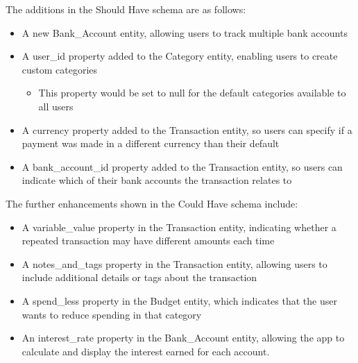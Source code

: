 \documentclass{l4proj}
\begin{document}
The additions in the Should Have schema are as follows:
\begin{itemize}
    \item A new Bank\_Account entity, allowing users to track multiple bank accounts
    \item A user\_id property added to the Category entity, enabling users to create custom categories
    \begin{itemize}
        \item This property would be set to null for the default categories available to all users
    \end{itemize}
    \item A currency property added to the Transaction entity, so users can specify if a payment was made in a different currency than their default
    \item A bank\_account\_id property added to the Transaction entity, so users can indicate which of their bank accounts the transaction relates to
\end{itemize}
\vspace{0.5em}
The further enhancements shown in the Could Have schema include:
\begin{itemize}
    \item A variable\_value property in the Transaction entity, indicating whether a repeated transaction may have different amounts each time
    \item A notes\_and\_tags property in the Transaction entity, allowing users to include additional details or tags about the transaction
    \item A spend\_less property in the Budget entity, which indicates that the user wants to reduce spending in that category
    \item An interest\_rate property in the Bank\_Account entity, allowing the app to calculate and display the interest earned for each account.
\end{itemize}
\end{document}
